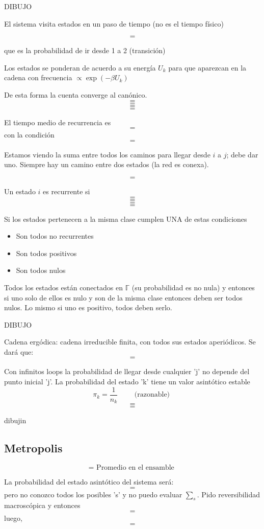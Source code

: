 \documentclass[10pt,oneside]{CBFT_book}
\begin{document}
DIBUJO 

El sistema visita estados en un paso de tiempo (no es el tiempo físico)

\[=\]

que es la probabilidad de ir desde 1 a 2 (transición)

Los estados se ponderan de acuerdo a su energía $U_k$ para que aparezcan en la cadena con frecuencia
$ \propto \exp(-\beta U_k ) $

De esta forma la cuenta converge al canónico.
\[=\]
\[=\]
\[=\]
\[=\]

El tiempo medio de recurrencia es
\[=\]
con la condición 
\[=\]

Estamos viendo la suma entre todos los caminos para llegar desde $i$ a $j$; debe dar uno.
Siempre hay un camino entre dos estados (la red es conexa).

\[=\]

Un estado $i$ es recurrente si 
\[=\]
\[=\]
\[=\]
\[=\]


Si los estados pertenecen a la misma clase cumplen UNA de estas condiciones 
\begin{itemize}
 \item Son todos no recurrentes
 \item Son todos positivos
 \item Son todos nulos
\end{itemize}

Todos los estados están conectados en $ \mathbb{\Gamma} $  (su probabilidad es no nula) y entonces
si uno solo de ellos es nulo y son de la misma clase entonces deben ser todos nulos.
Lo mismo si uno es positivo, todos deben serlo.

DIBUJO 

Cadena ergódica: cadena irreducible finita, con todos sus estados aperiódicos. 
Se dará que:
\[=\]

Con infinitos loops la probabilidad de llegar desde cualquier 'j' no depende del punto inicial 'j'.
La probabilidad del estado 'k' tiene un valor asintótico estable
\[
	\pi_k = \frac{1}{n_k} \qquad \text{ (razonable) } 
\]
\[=\]
\[=\]

dibujin

\subsection{Metropolis}

\[= \text{ Promedio en el ensamble } \]

La probabilidad del estado asintótico del sistema será:
\[=\]
pero no conozco todos los posibles 's' y no puedo evaluar $\sum_s$.
Pido reversibilidad macroscópica y entonces
\[=\]
luego,
\[=\]
\end{document}
